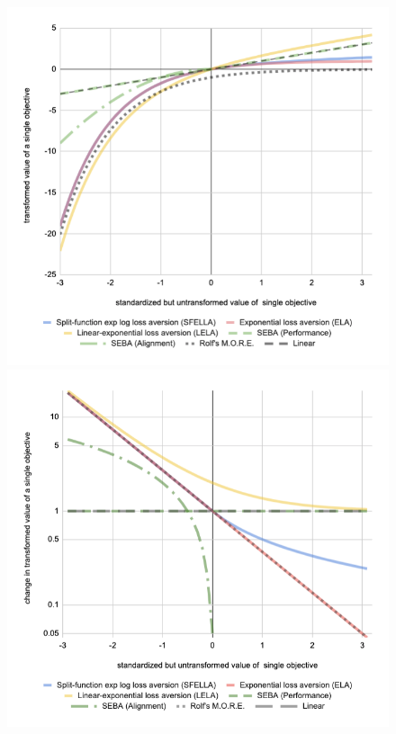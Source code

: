 \begin{figure}[h]
  \includegraphics[width=\columnwidth]{output/transform_graph-2d_with_rolf2.png}%
  \includegraphics[width=\columnwidth]{output/transform_graph_2d_integral_with_rolf2.png}%

\end{figure}

